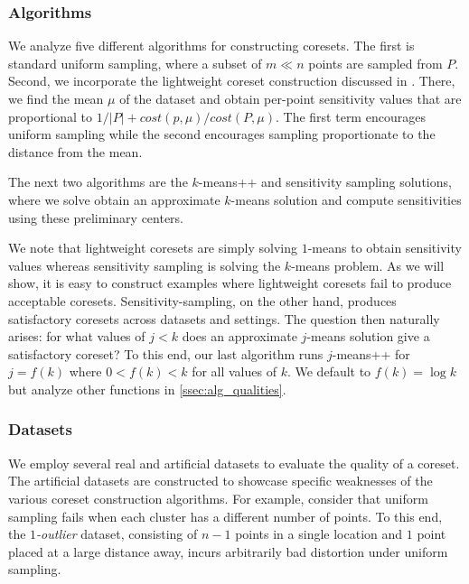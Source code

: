 
\subsubsection{Algorithms}

We analyze five different algorithms for constructing coresets. The first is standard uniform sampling, where a subset of $m \ll n$ points are sampled from $P$.
Second, we incorporate the lightweight coreset construction discussed in \cite{lightweight_coresets}. There, we find the mean $\mu$ of the dataset and obtain
per-point sensitivity values that are proportional to $1/|P| + cost(p, \mu) / cost(P, \mu)$. The first term encourages uniform sampling while the second
encourages sampling proportionate to the distance from the mean.

The next two algorithms are the $k$-means++ and \fkmeans sensitivity sampling solutions, where we solve obtain an approximate $k$-means solution and
compute sensitivities using these preliminary centers.

We note that lightweight coresets are simply solving $1$-means to obtain sensitivity values whereas sensitivity sampling is solving the $k$-means problem.  As
we will show, it is easy to construct examples where lightweight coresets fail to produce acceptable coresets. Sensitivity-sampling, on the other hand, produces
satisfactory coresets across datasets and settings. The question then naturally arises: for what values of $j < k$ does an approximate $j$-means solution give
a satisfactory coreset? To this end, our last algorithm runs $j$-means++ for $j = f(k)$ where $0 < f(k) < k$ for all values of $k$. We default to $f(k) = \log
k$ but analyze other functions in \ref{ssec:alg_qualities}.

\subsubsection{Datasets}

We employ several real and artificial datasets to evaluate the quality of a coreset.  The artificial datasets are constructed to showcase specific weaknesses of
the various coreset construction algorithms. For example, consider that uniform sampling fails when each cluster has a different number of points. To this end,
the \emph{$1$-outlier} dataset, consisting of $n-1$ points in a single location and $1$ point placed at a large distance away, incurs arbitrarily bad distortion
under uniform sampling. 


